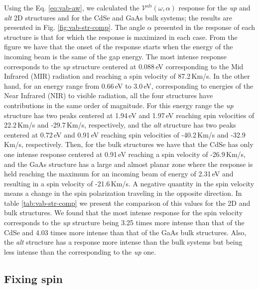 \documentclass[prb,11pt,tightenlines,twocolumn,aps]{revtex4-1}
\begin{document}
{\color{red}Using the Eq. \eqref{eq:vab-aw}, we calculated the
$\mathcal{V}^{\mathrm{ab}}(\omega,\alpha)$ response for the \emph{up} and
\emph{alt} 2D structures and for the CdSe and GaAs bulk systems; the results
are presented in Fig. \ref{fig:vab-str-comp}. The angle $\alpha$ presented in
the response of each structure is that for which the response is maximized in
each case.}
% 
From the figure we have that the onset of the response starts when the energy
of the incoming beam is the same of the gap energy.
% 
The most intense response corresponds to the \emph{up} structure centered at
0.088\,eV corresponding to the {\color{red} Mid Infrared (MIR)} radiation and
reaching a spin velocity of 87.2\,Km/s.
% 
In the other hand, for an energy range from 0.66\,eV to 3.0\,eV, corresponding
to energies of the {\color{red} Near Infrared (NIR) to visible radiation}, all
the four structures have contributions in the same order of magnitude.
% 
For this energy range the \emph{up} structure has two peaks centered at
1.94\,eV and 1.97\,eV reaching spin velocities of 22.2\,Km/s and -29.7\,Km/s,
respectively, and the \emph{alt} structure has two peaks centered at 0.72\,eV
and 0.91\,eV reaching spin velocities of -40.2\,Km/s and -32.9\,Km/s,
respectively.
% 
Then, for the bulk structures we have that the CdSe has only one intense
response centered at 0.91\,eV reaching a spin velocity of -26.9\,Km/s, and the
GaAs structure has a large and almost planar zone where the response is held
reaching the maximum for an incoming beam of energy of 2.31\,eV and resulting
in a spin velocity of -21.6\,Km/s.
% 
{\color{red} A negative quantity in the spin velocity means a change in the
spin polarization traveling in the opposite direction.
% 
In table \ref{tab:vab-str-comp} we present the comparison of this values for
the 2D and bulk structures. We found that the most intense response for the
spin velocity corresponds to the \emph{up} structure being 3.25 times more
intense than that of the CdSe and 4.03 times more intense than that of the GaAs
bulk structures. Also, the \emph{alt} structure has a response more intense
than the bulk systems but being less intense than the corresponding to the
\emph{up} one.}
% 




\subsection{Fixing spin} %
\label{sec:res-fixspin}
\end{document}
